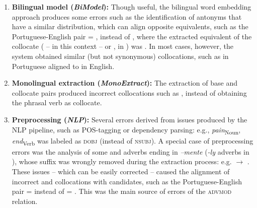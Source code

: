 \documentclass[output=paper
,modfonts
,nonflat]{langsci/langscibook}
\begin{document}
\begin{enumerate}
\item \textbf{Bilingual model (\textit{BiModel}):} Though useful, the bilingual word embedding approach
  produces some errors such as the identification of antonyms that have a similar distribution, which can align opposite 
  equivalents, such as the Portuguese-English pair  = , instead of , where the extracted equivalent of the collocate  ( -- in this context -- or , in )
  was . In most cases, however, the system obtained similar
  (but not synonymous) collocations, such as  in Portuguese aligned to  in English.

\item \textbf{Monolingual extraction (\textit{MonoExtract}):} The extraction of base and
  collocate pairs produced incorrect collocations such as
  ,
  instead of obtaining the phrasal verb  as collocate.  
  
\item \textbf{Preprocessing (\textit{NLP}):} Several errors derived from issues produced
  by the NLP pipeline, such as POS-tagging or dependency parsing:
  e.g., \textit{pain}\textsubscript{Noun},\\\textit{end}\textsubscript{Verb} was labeled
  as \textsc{dobj} (instead of \textsc{nsubj}).
  A special case of preprocessing errors was the analysis of some 
  and  adverbs ending in \emph{--mente} (\emph{-ly} adverbs in ),
  whose suffix was wrongly removed during the extraction process: e.g.  $\rightarrow$ . These issues -- which can be easily corrected --
  caused the alignment of incorrect  and   collocations with
   candidates, such as the Portuguese-English pair  =  instead of  = . This was the main source of errors of the \textsc{advmod} relation.


\end{enumerate}
\end{document}
